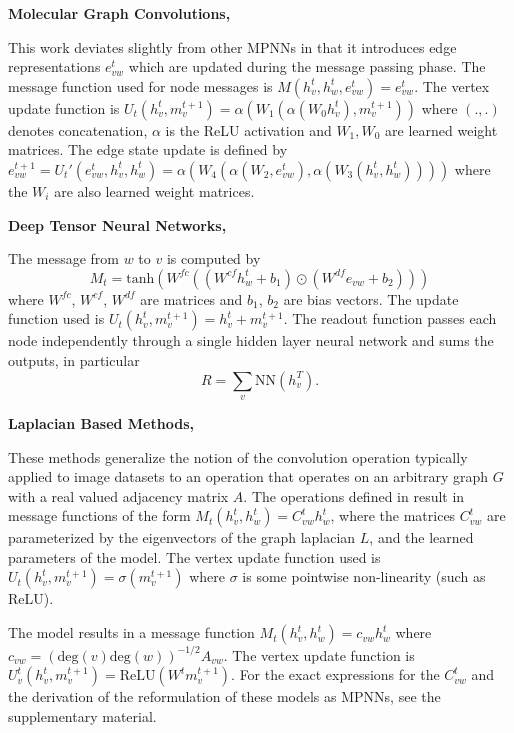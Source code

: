 \documentclass{article}
\begin{document}
\textbf{Molecular Graph Convolutions, \citet{kearnes2016molecular}}

This work deviates slightly from other MPNNs in that it introduces edge representations $e_{vw}^t$ which are updated during the message passing phase. The message function used for node messages is $M(h_v^t, h_w^t, e_{vw}^t) = e_{vw}^t$. The vertex update function is $U_t(h_v^t, m_v^{t+1}) = \alpha ( W_1 (\alpha(W_0 h_v^t), m_v^{t+1}) )$ where $(.,.)$ denotes concatenation, $\alpha$ is the ReLU activation and $W_1, W_0$ are learned weight matrices.  The edge state update is defined by $e_{vw}^{t+1} = U_t'(e_{vw}^t, h_v^t, h_w^t) =  \alpha ( W_4 
    (\alpha (W_2, e_{vw}^t) , \alpha (W_3 (h_v^t, h_w^t)) )  )$ where the $W_i$ are also learned weight matrices. 

\textbf{Deep Tensor Neural Networks, \citet{schutt2017quantum}}

    The message from $w$ to $v$ is computed by
    \[M_t = \textrm{tanh}\left( W^{fc}((W^{cf} h^t_w + b_1) \odot (W^{df} e_{vw} + b_2)) \right)\]
    where $W^{fc}$, $W^{cf}$, $W^{df}$ are matrices and $b_1$, $b_2$ are bias vectors. The update function used is $U_t(h_v^t, m_v^{t+1}) = h_v^t + m_v^{t+1}$. The readout function passes each node independently through a single hidden layer neural network and sums the outputs, in particular
    \[R = \sum\limits_{v} \textrm{NN}(h_v^{T}). \]

\textbf{Laplacian Based Methods, \citet{bruna2013spectral,defferrard2016convolutional,kipf2016}}

    These methods generalize the notion of the convolution operation typically applied to image datasets to an operation that operates on an arbitrary graph $G$ with a real valued adjacency matrix $A$. The operations defined in \citet{bruna2013spectral,defferrard2016convolutional} result in message functions of the form $M_t(h_v^t, h_w^t) = C^t_{vw} h_w^t$, where the matrices $C^t_{vw}$ are parameterized by the eigenvectors of the graph laplacian $L$, and the learned parameters of the model. The vertex update function used is $U_t(h_v^t, m_v^{t+1}) = \sigma(m_v^{t+1})$ where $\sigma$ is some pointwise non-linearity (such as ReLU).
    
    The \citet{kipf2016} model results in a message function $M_t(h_v^t, h_w^t) = c_{vw} h_w^t$ where $c_{vw} = \left(\textrm{deg}(v) \textrm{deg}(w)\right)^{-1/2} A_{vw}$. The vertex update function is $U_v^{t}(h_v^t, m_v^{t+1}) = \textrm{ReLU}(W^t m_v^{t+1})$. For the exact expressions for the $C^t_{vw}$ and the derivation of the reformulation of these models as MPNNs, see the supplementary material. 
\end{document}
